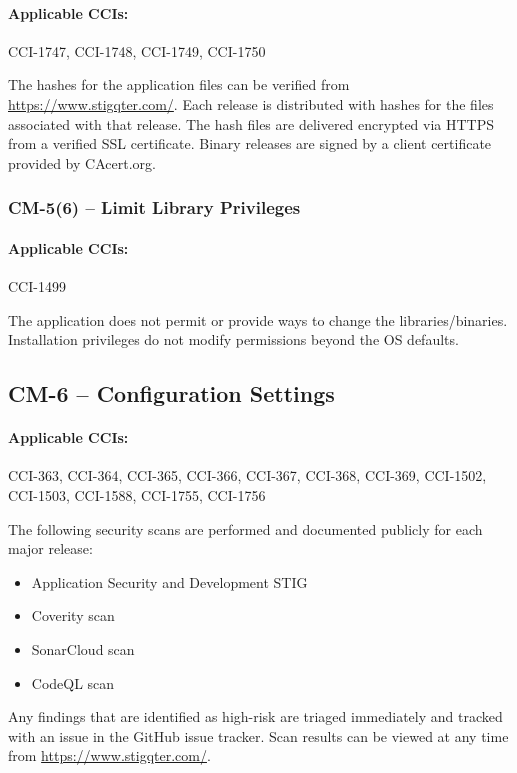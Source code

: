 \documentclass[letterpaper, 10pt, twoside]{article}
\begin{document}
\paragraph{Applicable CCIs:} CCI-1747, CCI-1748, CCI-1749, CCI-1750

The hashes for the application files can be verified from \url{https://www.stigqter.com/}. Each release is distributed with hashes for the files associated with that release. The hash files are delivered encrypted via HTTPS from a verified SSL certificate. Binary releases are signed by a client certificate provided by CAcert.org.

\subsubsection{CM-5(6) -- Limit Library Privileges}

\paragraph{Applicable CCIs:} CCI-1499

The application does not permit or provide ways to change the libraries/binaries. Installation privileges do not modify permissions beyond the OS defaults.

\subsection{CM-6 -- Configuration Settings}

\paragraph{Applicable CCIs:} CCI-363, CCI-364, CCI-365, CCI-366, CCI-367, CCI-368, CCI-369, CCI-1502, CCI-1503, CCI-1588, CCI-1755, CCI-1756

The following security scans are performed and documented publicly for each major release:
\begin{itemize}
	\item Application Security and Development STIG
	\item Coverity scan
	\item SonarCloud scan
	\item CodeQL scan
\end{itemize}

Any findings that are identified as high-risk are triaged immediately and tracked with an issue in the GitHub issue tracker. Scan results can be viewed at any time from \url{https://www.stigqter.com/}.
\end{document}
